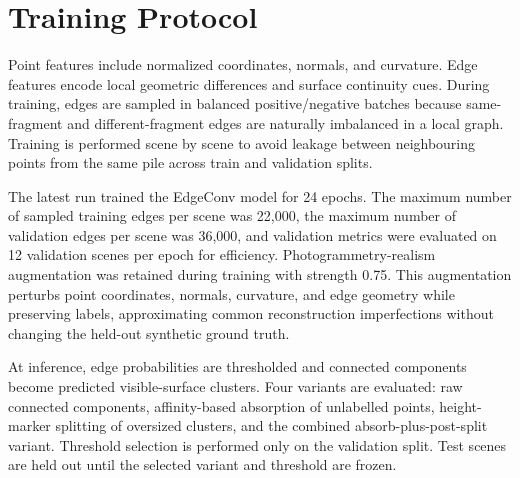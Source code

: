 \documentclass[11pt]{article}
\begin{document}
\section{Training Protocol}
Point features include normalized coordinates, normals, and curvature. Edge features encode local geometric differences and surface continuity cues. During training, edges are sampled in balanced positive/negative batches because same-fragment and different-fragment edges are naturally imbalanced in a local graph. Training is performed scene by scene to avoid leakage between neighbouring points from the same pile across train and validation splits.

The latest run trained the EdgeConv model for 24 epochs. The maximum number of sampled training edges per scene was 22,000, the maximum number of validation edges per scene was 36,000, and validation metrics were evaluated on 12 validation scenes per epoch for efficiency. Photogrammetry-realism augmentation was retained during training with strength 0.75. This augmentation perturbs point coordinates, normals, curvature, and edge geometry while preserving labels, approximating common reconstruction imperfections without changing the held-out synthetic ground truth.

At inference, edge probabilities are thresholded and connected components become predicted visible-surface clusters. Four variants are evaluated: raw connected components, affinity-based absorption of unlabelled points, height-marker splitting of oversized clusters, and the combined absorb-plus-post-split variant. Threshold selection is performed only on the validation split. Test scenes are held out until the selected variant and threshold are frozen.
\end{document}
